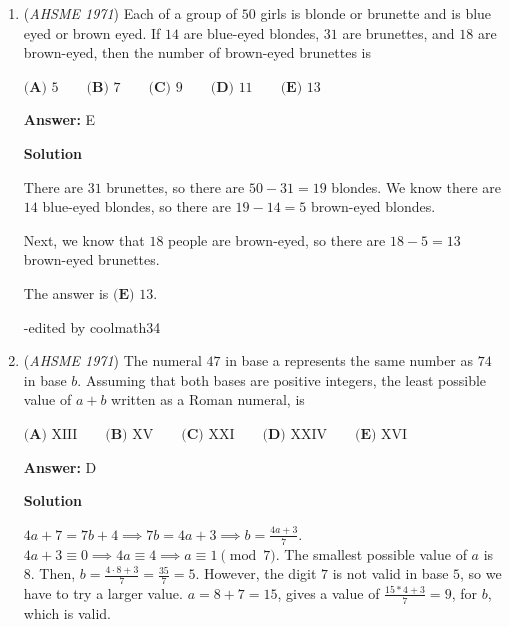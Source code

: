 \begin{enumerate}
 Draw $\overline{AE} \perp \overline{BD}$ with $E$ on $\overline{BD}.$ $ABDC$ is a \href{https://artofproblemsolving.com/wiki/index.php?title=Rectangle}{rectangle}, so, knowing the radii of the circles, we see that $BE = BD - ED = BD - AC = 14 - 4 = 10.$

 Points $A, E,$ and $B$ form a right triangle with legs $10$ and $24.$ We are looking for $AB,$ which is $\sqrt{10^2 + 24^2} = 26$ by the \href{https://artofproblemsolving.com/wiki/index.php?title=Pythagorean\_Theorem}{Pythagorean Theorem}.

 Thus, our answer is $\boxed{\textbf{(D) }26}$.

 -edited by coolmath34

 


	\item (\textit{AHSME 1971}) Each of a group of $50$ girls is blonde or brunette and is blue eyed or brown eyed. If $14$ are blue-eyed blondes, 
$31$ are brunettes, and $18$ are brown-eyed, then the number of brown-eyed brunettes is


 $\textbf{(A) }5\qquad \textbf{(B) }7\qquad \textbf{(C) }9\qquad \textbf{(D) }11\qquad  \textbf{(E) }13$

 \textbf{Answer: }E



\textbf{Solution}

There are $31$ brunettes, so there are $50-31=19$ blondes. We know there are $14$ blue-eyed blondes, so there are $19-14=5$ brown-eyed blondes.

 Next, we know that $18$ people are brown-eyed, so there are $18-5=13$ brown-eyed brunettes.

 The answer is $\boxed{\textbf{(E) }13}.$

 -edited by coolmath34

 


	\item (\textit{AHSME 1971}) The numeral $47$ in base a represents the same number as $74$ in base $b$. Assuming that both bases are positive 
integers, the least possible value of $a+b$ written as a Roman numeral, is


 $\textbf{(A) }\mathrm{XIII}\qquad \textbf{(B) }\mathrm{XV}\qquad \textbf{(C) }\mathrm{XXI}\qquad \textbf{(D) }\mathrm{XXIV}\qquad \textbf{(E) }\mathrm{XVI}$

 \textbf{Answer: }D



\textbf{Solution}

$4a+7=7b+4\implies 7b=4a+3\implies b=\frac{4a+3}{7}$. $4a+3\equiv 0\implies 4a\equiv 4\implies a\equiv1 \pmod{7}$. The smallest possible value of $a$ is $8$. Then, $b=\frac{4\cdot8+3}{7}=\frac{35}{7}=5$. However, the digit $7$ is not valid in base $5$, so we have to try a larger value. $a=8+7=15$, gives a value of $\frac{15*4+3}{7}=9$, for $b$, which is valid. 


\end{enumerate}
